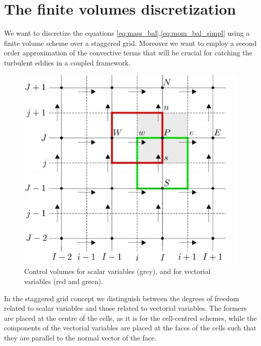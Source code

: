 \documentclass[12pt, a4paper]{article}
\begin{document}
\section{The finite volumes discretization}
We want to discretize the equations 
\eqref{eq:mass_bal},\eqref{eq:mom_bal_simpl} using a finite volume scheme over 
a staggered grid. Moreover we want to employ a second order approximation of 
the convective terms that will be crucial for catching the turbulent eddies in 
a coupled framework.
\begin{figure}[h]
	\centering
	\includegraphics[scale=0.5]{staggered_grid}
	\caption{Control volumes for scalar variables (grey), and for vectorial 
	variables (red and green).}
	\label{fig:grid}
\end{figure}
In the staggered grid concept we distinguish between the degrees of freedom 
related to scalar variables and those related to vectorial variables. The 
formers are placed at the centre of the cells, as it is for the cell-centred 
schemes, while the components of the vectorial variables are placed at the 
faces of the cells such that they are parallel to the normal vector of the face.
\end{document}
